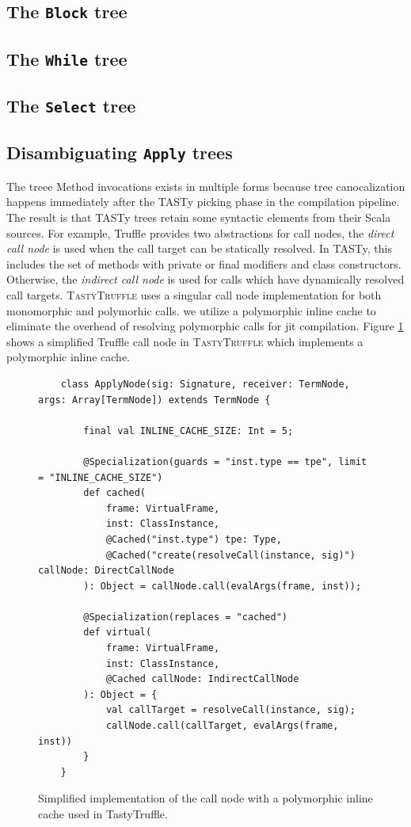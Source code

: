 \subsection{The \texttt{Block} tree}

\subsection{The \texttt{While} tree}

\subsection{The \texttt{Select} tree}


\subsection{Disambiguating \texttt{Apply} trees}

The  treee
Method invocations exists in multiple forms because tree canocalization happens immediately after the TASTy picking phase in the compilation pipeline.
The result is that TASTy trees retain some syntactic elements from their Scala sources. 
For example, Truffle provides two abstractions for call nodes, the \textit{direct call node} is used when the call target can be statically resolved. 
In TASTy, this includes the set of methods with private or final modifiers\cite{java:lang-spec} and class constructors. 
Otherwise, the \textit{indirect call node} is used for calls which have dynamically resolved call targets. 
\textsc{TastyTruffle} uses a singular call node implementation for both monomorphic and polymorhic calls. 
we utilize a polymorphic inline cache\cite{self:polymorphic-inline-caches} to eliminate the overhead of resolving polymorphic calls for \acrshort{jit} compilation. 
Figure \ref{implementation:poly-cache-call-node} shows a simplified Truffle call node in \textsc{TastyTruffle} which implements a polymorphic inline cache.

\begin{figure}[!htb]
	\begin{verbatim}
	class ApplyNode(sig: Signature, receiver: TermNode, args: Array[TermNode]) extends TermNode {
		
		final val INLINE_CACHE_SIZE: Int = 5;
		
		@Specialization(guards = "inst.type == tpe", limit = "INLINE_CACHE_SIZE")
		def cached(
			frame: VirtualFrame,
			inst: ClassInstance,
			@Cached("inst.type") tpe: Type,
			@Cached("create(resolveCall(instance, sig)") callNode: DirectCallNode
		): Object = callNode.call(evalArgs(frame, inst));
		
		@Specialization(replaces = "cached")
		def virtual(
			frame: VirtualFrame,
			inst: ClassInstance,
			@Cached callNode: IndirectCallNode
		): Object = {
			val callTarget = resolveCall(instance, sig);
			callNode.call(callTarget, evalArgs(frame, inst))
		}
	}
	\end{verbatim}
	\caption{Simplified implementation of the call node with a polymorphic inline cache used in TastyTruffle.}
	\label{implementation:poly-cache-call-node}
\end{figure}

